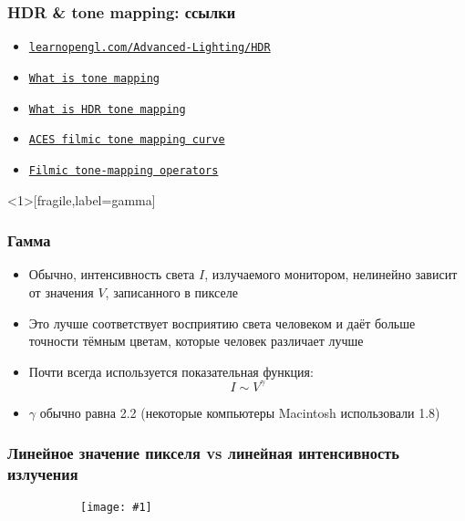 \documentclass[10pt]{beamer}
\newcommand{\slideimage}[1]{
  \begin{figure}
    \begin{adjustbox}{width=\textwidth, totalheight=\textheight-2\baselineskip-2\baselineskip,keepaspectratio}
      \texttt{[image: \#1]}
    \end{adjustbox}
  \end{figure}
}
\begin{document}
\begin{frame}[fragile]
\frametitle{HDR \& tone mapping: ссылки}
\begin{itemize}
\item \href{https://learnopengl.com/Advanced-Lighting/HDR}{\texttt{learnopengl.com/Advanced-Lighting/HDR}}
\item \href{https://skylum.com/blog/what-is-tone-mapping}{\texttt{What is tone mapping}}
\item \href{https://www.veneratech.com/what-is-hdr-tone-mapping}{\texttt{What is HDR tone mapping}}
\item \href{https://knarkowicz.wordpress.com/2016/01/06/aces-filmic-tone-mapping-curve}{\texttt{ACES filmic tone mapping curve}}
\item \href{http://filmicworlds.com/blog/filmic-tonemapping-operators/}{\texttt{Filmic tone-mapping operators}}
\end{itemize}
\end{frame}

\begin{frame}<1>[fragile,label=gamma]
\frametitle{Гамма}
\begin{itemize}
\item Обычно, интенсивность света \begin{math}I\end{math}, излучаемого монитором, нелинейно зависит от значения \begin{math}V\end{math}, записанного в пикселе
\pause
\item Это лучше соответствует восприятию света человеком и даёт больше точности тёмным цветам, которые человек различает лучше
\pause
\item Почти всегда используется показательная функция:
\begin{equation}I \sim V^\gamma\end{equation}
\pause
\item \begin{math}\gamma\end{math} обычно равна 2.2 (некоторые компьютеры Macintosh использовали 1.8)
\end{itemize}
\end{frame}

\begin{frame}
\frametitle{Линейное значение пикселя vs линейная интенсивность излучения}
\begin{figure}
\slideimage{gamma-scale.png}
\end{figure}
\end{frame}
\end{document}

